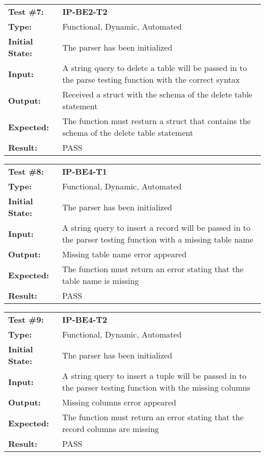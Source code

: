 \documentclass[12pt, titlepage]{article}
\begin{document}
\begin{mdframed}[linewidth=1pt]
\begin{tabularx}{\textwidth}{@{}p{3cm}X@{}}
{\bf Test \#7:} & {\bf IP-BE2-T2}\\[\baselineskip]
{\bf Type:} & Functional, Dynamic, Automated \\[0.5\baselineskip]
{\bf Initial State:} & The parser has been initialized \\[\baselineskip]
{\bf Input:} & A string query to delete a table will be passed in to the parse testing function with the correct syntax \\[\baselineskip]
{\bf Output:} & Received a struct with the schema of the delete table statement \\[\baselineskip]
{\bf Expected:} & The function must resturn a struct that contains the schema of the delete table statement \\[\baselineskip]
{\bf Result:} & PASS
\end{tabularx}
\end{mdframed}

\begin{mdframed}[linewidth=1pt]
\begin{tabularx}{\textwidth}{@{}p{3cm}X@{}}
{\bf Test \#8:} & {\bf IP-BE4-T1}\\[\baselineskip]
{\bf Type:} & Functional, Dynamic, Automated \\[0.5\baselineskip]
{\bf Initial State:} & The parser has been initialized \\[\baselineskip]
{\bf Input:} & A string query to insert a record will be passed in to the parser testing function with a missing table name \\[\baselineskip]
{\bf Output:} & Missing table name error appeared \\[\baselineskip]
{\bf Expected:} & The function must return an error stating that the table name is missing \\[\baselineskip]
{\bf Result:} & PASS
\end{tabularx}
\end{mdframed}

\begin{mdframed}[linewidth=1pt]
\begin{tabularx}{\textwidth}{@{}p{3cm}X@{}}
{\bf Test \#9:} & {\bf IP-BE4-T2}\\[\baselineskip]
{\bf Type:} & Functional, Dynamic, Automated \\[0.5\baselineskip]
{\bf Initial State:} & The parser has been initialized \\[\baselineskip]
{\bf Input:} & A string query to insert a tuple will be passed in to the parser testing function with the missing columns \\[\baselineskip]
{\bf Output:} & Missing columns error appeared \\[\baselineskip]
{\bf Expected:} & The function must return an error stating that the record columns are missing \\[\baselineskip]
{\bf Result:} & PASS
\end{tabularx}
\end{mdframed}
\end{document}
